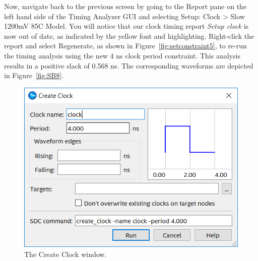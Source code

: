 \documentclass[11pt, twoside, pdftex]{article}
\begin{document}
Now, navigate back to the previous screen by going to the {\sf Report} pane on the left hand side of the Timing Analyzer GUI and selecting {\sf Setup: Clock > Slow 1200mV 85C Model}. You will notice that our clock timing report {\it Setup clock} is now out of date, as indicated by the yellow
font and highlighting. Right-click the report and select {\sf Regenerate}, as shown in 
Figure~\ref{fig:setconstraint5}, to re-run the timing analysis using the new 4 ns clock period constraint. 
This analysis results in a positive slack of 0.568 ns. The corresponding waveforms are depicted in 
Figure~\ref{fig:SB8}. 

\begin{figure}[H]
\begin{center}
\includegraphics[scale=0.55]{figures/setconstraint1.png}
\end{center}
\caption{The Create Clock window.}
\label{fig:setconstraint1}
\end{figure}
\end{document}
